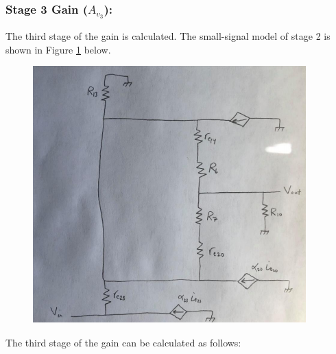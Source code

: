 \documentclass{article}
\begin{document}
	\subsubsection*{Stage 3 Gain ($A_{v_3}$):}
	The third stage of the gain is calculated.
	The small-signal model of stage 2 is shown in Figure \ref{f:5} below.
	\begin{figure}[!ht]
		\centering
		\includegraphics[width=0.7\textheight]{ssm_gain3.png}
		\label{f:5}
	\end{figure}
	The third stage of the gain can be calculated as follows:
\end{document}

